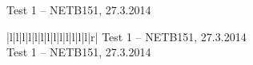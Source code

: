 \documentclass[10pt]{article}
\begin{document}
\normalbaselineskip
\setlength{\columnseprule}{0.25pt}




\newpage
%


\newpage
\begin{center}
Test 1 -- NETB151, 27.3.2014
\end{center}

\begin{longtable}{|l|l|l|l|l|l|l|l|l|l|l|l|l|r|}
{Test 1 -- NETB151, 27.3.2014}\\
\endfirsthead
\hline
{}
{Test 1 -- NETB151,  27.3.2014}\\
\hline
\endhead
\hline

\hline
\end{longtable}
\end{document}
